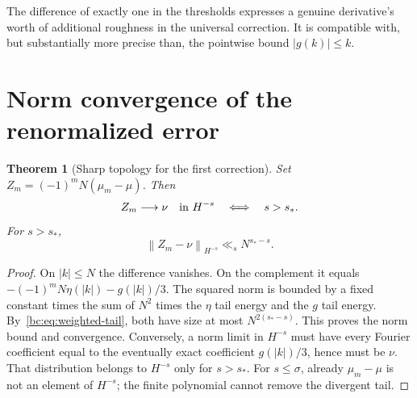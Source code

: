 \documentclass[11pt,a4paper,oneside,openany]{book}
\numberwithin{equation}{chapter}
\newtheorem{theorem}{Theorem}[chapter]
\theoremstyle{definition}
\theoremstyle{remark}
\newcommand{\norm}[1]{\left\lVert #1\right\rVert}
\begin{document}
The difference of exactly one in the thresholds expresses a genuine derivative's
worth of additional roughness in the universal correction. It is compatible with,
but substantially more precise than, the pointwise bound $|g(k)|\le k$.

\section{Norm convergence of the renormalized error}
\begin{theorem}[Sharp topology for the first correction]
\label{bc:thm:renormalized}
Set $Z_m=(-1)^mN(\mu_m-\mu)$. Then
\begin{equation}
 Z_m\longrightarrow\nu\quad\hbox{in }H^{-s}
 \quad\Longleftrightarrow\quad s>s_*.
 \label{bc:eq:Z-limit}
\end{equation}
For $s>s_*$,
\begin{equation}
 \norm{Z_m-\nu}_{H^{-s}}\ll_s N^{s_*-s}.
 \label{bc:eq:Z-rate}
\end{equation}
\end{theorem}
\begin{proof}
On $|k|\le N$ the difference vanishes. On the complement it equals
$-(-1)^mN\eta(|k|)-g(|k|)/3$. The squared norm is bounded by a fixed constant
times the sum of $N^2$ times the $\eta$ tail energy and the $g$ tail energy.
By~\eqref{bc:eq:weighted-tail}, both have size at most $N^{2(s_*-s)}$.
This proves the norm bound and convergence. Conversely, a norm limit in
$H^{-s}$ must have every Fourier coefficient equal to the eventually exact
coefficient $g(|k|)/3$, hence must be $\nu$. That distribution belongs to
$H^{-s}$ only for $s>s_*$. For $s\le\sigma$, already $\mu_m-\mu$ is not an
element of $H^{-s}$; the finite polynomial cannot remove the divergent tail.
\end{proof}
\end{document}
